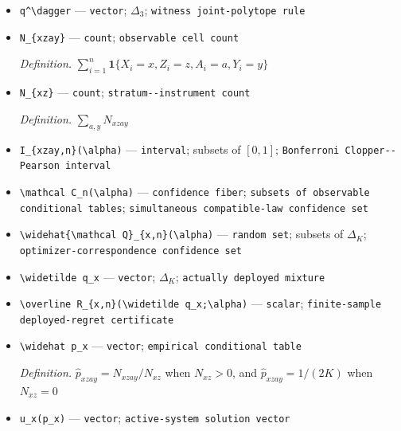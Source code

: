 \documentclass{article}
\begin{document}
\begin{itemize}
  \item \texttt{q\textasciicircum{}\textbackslash{}\allowbreak{}dagger} --- \texttt{vector}; \(\Delta_3\); \texttt{witness joint-\allowbreak{}polytope rule}
  \item \texttt{N\_\allowbreak{}\{xzay\}\allowbreak{}} --- \texttt{count}; \texttt{observable cell count}
  \par\smallskip\noindent\emph{Definition.} \(\sum_{i=1}^n\mathbf 1\{X_i=x,Z_i=z,A_i=a,Y_i=y\}\)
  \item \texttt{N\_\allowbreak{}\{xz\}\allowbreak{}} --- \texttt{count}; \texttt{stratum-\allowbreak{}-\allowbreak{}instrument count}
  \par\smallskip\noindent\emph{Definition.} \(\sum_{a,y}N_{xzay}\)
  \item \texttt{I\_\allowbreak{}\{xzay,\allowbreak{}n\}\allowbreak{}(\textbackslash{}\allowbreak{}alpha)} --- \texttt{interval}; subsets of \([0,1]\); \texttt{Bonferroni Clopper-\allowbreak{}-\allowbreak{}Pearson interval}
  \item \texttt{\textbackslash{}\allowbreak{}mathcal C\_\allowbreak{}n(\textbackslash{}\allowbreak{}alpha)} --- \texttt{confidence fiber}; \texttt{subsets of observable conditional tables}; \texttt{simultaneous compatible-\allowbreak{}law confidence set}
  \item \texttt{\textbackslash{}\allowbreak{}widehat\{\textbackslash{}\allowbreak{}mathcal Q\}\allowbreak{}\_\allowbreak{}\{x,\allowbreak{}n\}\allowbreak{}(\textbackslash{}\allowbreak{}alpha)} --- \texttt{random set}; subsets of \(\Delta_K\); \texttt{optimizer-\allowbreak{}correspondence confidence set}
  \item \texttt{\textbackslash{}\allowbreak{}widetilde q\_\allowbreak{}x} --- \texttt{vector}; \(\Delta_K\); \texttt{actually deployed mixture}
  \item \texttt{\textbackslash{}\allowbreak{}overline R\_\allowbreak{}\{x,\allowbreak{}n\}\allowbreak{}(\textbackslash{}\allowbreak{}widetilde q\_\allowbreak{}x;\allowbreak{}\textbackslash{}\allowbreak{}alpha)} --- \texttt{scalar}; \texttt{finite-\allowbreak{}sample deployed-\allowbreak{}regret certificate}
  \item \texttt{\textbackslash{}\allowbreak{}widehat p\_\allowbreak{}x} --- \texttt{vector}; \texttt{empirical conditional table}
  \par\smallskip\noindent\emph{Definition.} \(\widehat p_{xzay}=N_{xzay}/N_{xz}\) when \(N_{xz}>0\), and \(\widehat p_{xzay}=1/(2K)\) when \(N_{xz}=0\)
  \item \texttt{u\_\allowbreak{}x(p\_\allowbreak{}x)} --- \texttt{vector}; \texttt{active-\allowbreak{}system solution vector}

\end{itemize}
\end{document}
